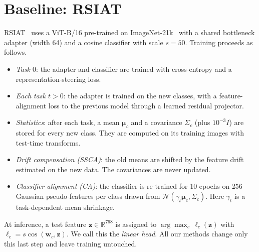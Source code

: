\section{Baseline: RSIAT}
\label{sec:background}

RSIAT~\cite{rsiat} uses a ViT-B/16 pre-trained on ImageNet-21k~\cite{dosovitskiy2021vit}
with a shared bottleneck adapter (width 64) and a cosine classifier with scale
$s=50$. Training proceeds as follows.

\begin{itemize}
  \item \emph{Task $0$}: the adapter and classifier are trained with
    cross-entropy and a representation-steering loss.
  \item \emph{Each task $t>0$}: the adapter is trained on the new classes, with
    a feature-alignment loss to the previous model through a learned residual
    projector.
  \item \emph{Statistics}: after each task, a mean $\boldsymbol\mu_c$ and a
    covariance $\Sigma_c$ (plus $10^{-3}I$) are stored for every new class.
    They are computed on its training images with test-time transforms.
  \item \emph{Drift compensation (SSCA)}: the old means are shifted by the
    feature drift estimated on the new data. The covariances are never
    updated.
  \item \emph{Classifier alignment (CA)}: the classifier is re-trained for 10
    epochs on 256 Gaussian pseudo-features per class drawn from
    $\mathcal N(\gamma_t\boldsymbol\mu_c,\Sigma_c)$. Here $\gamma_t$ is a
    task-dependent mean shrinkage.
\end{itemize}

At inference, a test feature $\mathbf z\in\mathbb R^{768}$ is assigned to
$\arg\max_c\, \ell_c(\mathbf z)$ with $\ell_c=s\cos(\mathbf w_c,\mathbf z)$. We call
this the \emph{linear head}. All our methods change only this last step and
leave training untouched.
